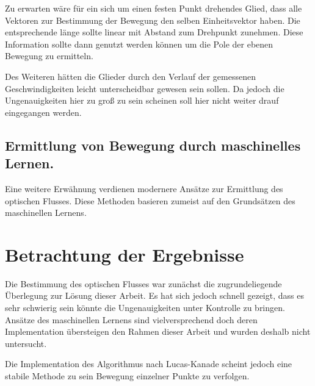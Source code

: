 Zu erwarten wäre für ein sich um einen festen Punkt drehendes Glied, dass alle Vektoren zur Bestimmung der Bewegung den selben Einheitsvektor haben.
Die entsprechende länge sollte linear mit Abstand zum Drehpunkt zunehmen.
Diese Information sollte dann genutzt werden können um die Pole der ebenen Bewegung zu ermitteln.

Des Weiteren hätten die Glieder durch den Verlauf der gemessenen Geschwindigkeiten leicht unterscheidbar gewesen sein sollen.
Da jedoch die Ungenauigkeiten hier zu groß zu sein scheinen soll hier nicht weiter drauf eingegangen werden.


\subsection{Ermittlung von Bewegung durch maschinelles Lernen.}

Eine weitere Erwähnung verdienen modernere Ansätze zur Ermittlung des optischen Flusses.
Diese Methoden basieren zumeist auf den Grundsätzen des maschinellen Lernens.


\section{Betrachtung der Ergebnisse}

Die Bestimmung des optischen Flusses war zunächst die zugrundeliegende Überlegung zur Lösung dieser Arbeit.
Es hat sich jedoch schnell gezeigt, dass es sehr schwierig sein könnte die Ungenauigkeiten unter Kontrolle zu bringen.
Ansätze des maschinellen Lernens sind vielversprechend doch deren Implementation übersteigen den Rahmen dieser Arbeit und wurden deshalb nicht untersucht.

Die Implementation des Algorithmus nach Lucas-Kanade scheint jedoch eine stabile Methode zu sein Bewegung einzelner Punkte zu verfolgen.


